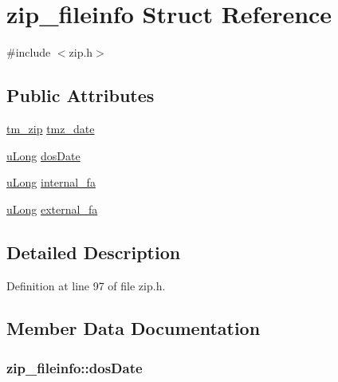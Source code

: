 \hypertarget{structzip__fileinfo}{\section{zip\-\_\-fileinfo Struct Reference}
\label{structzip__fileinfo}
}


{\ttfamily \#include $<$zip.\-h$>$}

\subsection*{Public Attributes}
\begin{DoxyCompactItemize}
\item 
\hyperlink{zip_8h_a93b9012a85479327c6da966108d8f743}{tm\-\_\-zip} \hyperlink{structzip__fileinfo_ae09a694a598b7507d23705764c9e46fb}{tmz\-\_\-date}
\item 
\hyperlink{zconf_8h_a154b3b80120c903a368fec5f11f3007a}{u\-Long} \hyperlink{structzip__fileinfo_a0541c57e59450fbc17b2f898ca4bc9e8}{dos\-Date}
\item 
\hyperlink{zconf_8h_a154b3b80120c903a368fec5f11f3007a}{u\-Long} \hyperlink{structzip__fileinfo_a396175a434b86115ce5600ab1dbb1644}{internal\-\_\-fa}
\item 
\hyperlink{zconf_8h_a154b3b80120c903a368fec5f11f3007a}{u\-Long} \hyperlink{structzip__fileinfo_ac0be78ded330ffd46815bafc5b6b37bb}{external\-\_\-fa}
\end{DoxyCompactItemize}


\subsection{Detailed Description}


Definition at line 97 of file zip.\-h.



\subsection{Member Data Documentation}
\hypertarget{structzip__fileinfo_a0541c57e59450fbc17b2f898ca4bc9e8}{
\subsubsection[{dos\-Date}]{ zip\-\_\-fileinfo\-::dos\-Date}}\label{structzip__fileinfo_a0541c57e59450fbc17b2f898ca4bc9e8}


